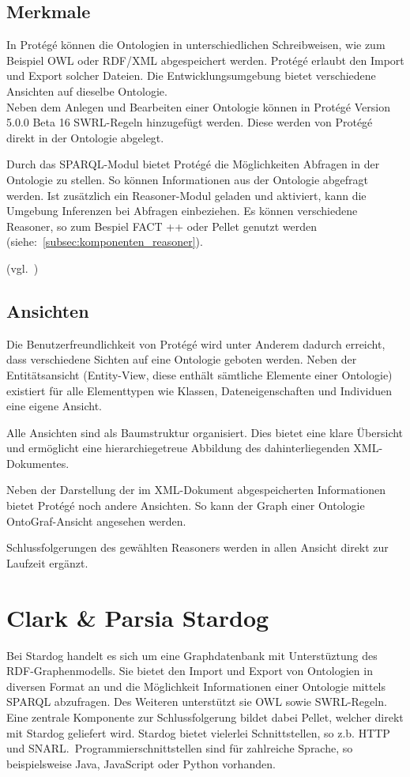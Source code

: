 \subsection{Merkmale}
\label{subsec:komponenten_protege_features}
In Protégé können die Ontologien in unterschiedlichen Schreibweisen, wie zum Beispiel OWL oder RDF/XML abgespeichert werden. Protégé erlaubt den Import und Export solcher Dateien. Die Entwicklungsumgebung bietet verschiedene Ansichten auf dieselbe Ontologie. \\
Neben dem Anlegen und Bearbeiten einer Ontologie können in Protégé Version 5.0.0 Beta 16 SWRL-Regeln hinzugefügt werden. Diese werden von Protégé direkt in der Ontologie abgelegt. 

Durch das SPARQL-Modul bietet Protégé die Möglichkeiten Abfragen in der Ontologie zu stellen. So können Informationen aus der Ontologie abgefragt werden. Ist zusätzlich ein Reasoner-Modul geladen und aktiviert, kann die Umgebung Inferenzen bei Abfragen einbeziehen. Es können verschiedene Reasoner, so zum Bespiel FACT ++ oder Pellet genutzt werden (siehe:~\ref{subsec:komponenten_reasoner}).

(vgl.~\cite{protegeFeatures})

\subsection{Ansichten}
\label{subsec:komponenten_protege_view}

Die Benutzerfreundlichkeit von Protégé wird unter Anderem dadurch erreicht, dass verschiedene Sichten auf eine Ontologie geboten werden. Neben der Entitätsansicht (Entity-View, diese enthält sämtliche Elemente einer Ontologie) existiert für alle Elementtypen wie Klassen, Dateneigenschaften und Individuen eine eigene Ansicht.

Alle Ansichten sind als Baumstruktur organisiert. Dies bietet eine klare Übersicht und ermöglicht eine hierarchiegetreue Abbildung des dahinterliegenden XML-Dokumentes.

Neben der Darstellung der im XML-Dokument abgespeicherten Informationen bietet Protégé noch andere Ansichten. So kann der Graph einer Ontologie OntoGraf-Ansicht angesehen werden.~\cite{protegeView}

Schlussfolgerungen des gewählten Reasoners werden in allen Ansicht direkt zur Laufzeit ergänzt.

\section{Clark \& Parsia Stardog}
\label{sec:komponenten_stardog}
Bei Stardog handelt es sich um eine Graphdatenbank mit Unterstüztung des RDF-Graphenmodells. Sie bietet den Import und Export von Ontologien in diversen Format an und die Möglichkeit Informationen einer Ontologie mittels SPARQL abzufragen. Des Weiteren unterstützt sie OWL sowie SWRL-Regeln. Eine zentrale Komponente zur Schlussfolgerung bildet dabei Pellet, welcher direkt mit Stardog geliefert wird. Stardog bietet vielerlei Schnittstellen, so z.b. HTTP und SNARL.\ Programmierschnittstellen sind für zahlreiche Sprache, so beispielsweise Java, JavaScript oder Python vorhanden.~\cite{stardogDocu}

